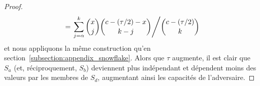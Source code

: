 \documentclass[letterpaper,twocolumn,10pt]{article}
\theoremstyle{definition}
\begin{document}
\begin{appendices}
{\begin{proof}
\begin{equation}
\begin{split}
&= \left.\sum_{j = \alpha}^{k} {x \choose j}{c-(\tau/2)-x \choose k-j}\middle/{c - (\tau/2) \choose k}\right.\\
\end{split}
\end{equation}
et nous appliquons la même construction qu'en section~\ref{subsection:appendix_snowflake}. Alors que $\tau$ augmente, il est clair que $S_a$ (et, réciproquement, $S_b$) deviennent plus indépendant et dépendent moins des valeurs par les membres de $S_d$, augmentant ainsi les capacités de l'adversaire.
\end{proof}


}





\end{appendices}
\end{document}
